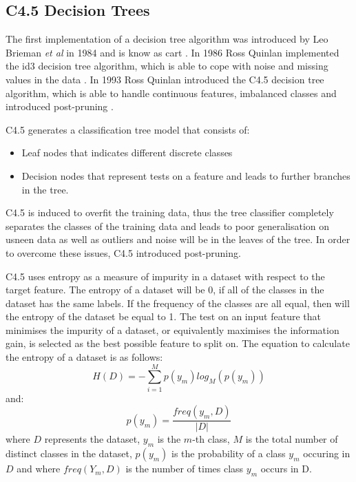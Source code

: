 \documentclass[10pt, conference]{IEEEtran}
\begin{document}
\subsection{C4.5 Decision Trees}\label{CT}

The first implementation of a decision tree algorithm was introduced by Leo Brieman \textit{et al} in 1984 and
is know as \acrfull{cart} \cite{CART_ref}. In 1986 Ross Quinlan implemented the \acrfull{id3} decision tree
algorithm, which is able to cope with noise and missing values in the data \cite{ID3_ref}. In 1993 Ross Quinlan
introduced the C4.5 decision tree algorithm, which is able to handle continuous features, imbalanced classes and
introduced post-pruning \cite{C4.5_ref}.

C4.5 generates a classification tree model that consists of:
\begin{itemize}
    \item Leaf nodes that indicates different discrete classes
    \item Decision nodes that represent tests on a feature and leads to further branches in the tree.
\end{itemize}
C4.5 is induced to overfit the training data, thus the tree classifier completely separates the classes of the
training data and leads to poor generalisation on usneen data as well as outliers and noise will be in the leaves of
the tree. In order to overcome these issues, C4.5 introduced post-pruning. 

C4.5 uses entropy as a measure of impurity in a dataset with respect to the target feature. The entropy of a
dataset will be 0, if all of the classes in the dataset has the same labels. If the frequency of the
classes are all equal, then will the entropy of the dataset be equal to 1. The test on an input feature
that minimises the impurity of a dataset, or equivalently maximises the information gain, is selected as the
best possible feature to split on. The equation to calculate the entropy of a dataset is as follows:
\begin{equation}
    H(D)=-\sum_{i=1}^{M} p(y_m)log_M (p(y_m))\label{entropy}
\end{equation}
and:
\begin{equation}
    p(y_m) = \frac{freq(y_m,D)}{\left\lvert D \right\rvert }\label{class_prob} 
\end{equation}
where $D$ represents the dataset, $y_m$ is the $m$-th class, $M$ is the total number of distinct classes in the
dataset, $p(y_m)$ is the probability of a class $y_m$ occuring in $D$ and where $freq(Y_m,D)$ is the number of
times class $y_m$ occurs in D.
\end{document}
